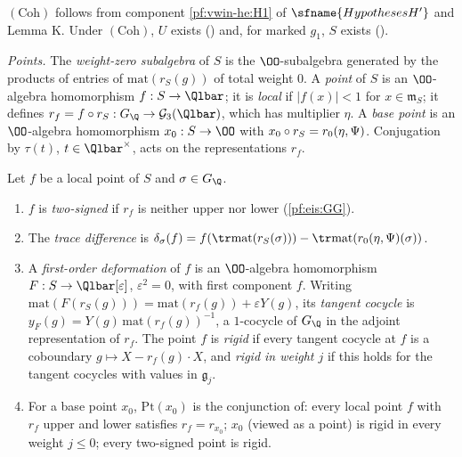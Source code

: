 $(\mathrm{Coh})$ follows from component \ref{pf:vwin-he:H1} of $\sfname{HypothesesH'}$ and Lemma K. Under $(\mathrm{Coh})$, $U$ exists
() and, for marked $g_1$, $S$ exists ().

\emph{Points.} The \emph{weight-zero subalgebra} of $S$ is the $\OO$-subalgebra generated by the products of entries of
$\mathrm{mat}(r_S(g))$ of total weight $0$. A \emph{point} of $S$ is an $\OO$-algebra homomorphism $f:S\to\Qlbar$; it is
\emph{local} if $|f(x)|<1$ for $x\in\mathfrak m_S$; it defines $r_f=f\circ r_S:G_\Q\to\eisGG(\Qlbar)$, which has multiplier
$\eta$. A \emph{base point} is an $\OO$-algebra homomorphism $x_0:S\to\OO$ with $x_0\circ r_S=r_0(\eta,\Psi)$. Conjugation by
$\tau(t)$, $t\in\Qlbar^\times$, acts on the representations $r_f$.

\begin{definition}\label{pf:eis:twopt}
Let $f$ be a local point of $S$ and $\sigma\in G_\Q$.
\begin{enumerate}[label=(\alph*)]
\item $f$ is \emph{two-signed} if $r_f$ is neither upper nor lower (\cref{pf:eis:GG}).
\item The \emph{trace difference} is $\eistr_\sigma(f)=f(\tr\mathrm{mat}(r_S(\sigma)))-\tr\mathrm{mat}(\eisrz(\eta,\Psi)(\sigma))$.
\item A \emph{first-order deformation} of $f$ is an $\OO$-algebra homomorphism $F:S\to\Qlbar[\varepsilon]$, $\varepsilon^2=0$, with
  first component $f$. Writing $\mathrm{mat}(F(r_S(g)))=\mathrm{mat}(r_f(g))+\varepsilon Y(g)$, its \emph{tangent cocycle} is
  $y_F(g)=Y(g)\,\mathrm{mat}(r_f(g))^{-1}$, a $1$-cocycle of $G_\Q$ in the adjoint representation of $r_f$. The point $f$ is
  \emph{rigid} if every tangent cocycle at $f$ is a coboundary $g\mapsto X-r_f(g)\cdot X$, and \emph{rigid in weight $j$} if
  this holds for the tangent cocycles with values in $\mathfrak g_j$.
\item For a base point $x_0$, $\mathrm{Pt}(x_0)$ is the conjunction of: every local point $f$ with $r_f$ upper and lower
  satisfies $r_f=r_{x_0}$; $x_0$ (viewed as a point) is rigid in every weight $j\le0$; every two-signed point is rigid.
\end{enumerate}
\end{definition}


